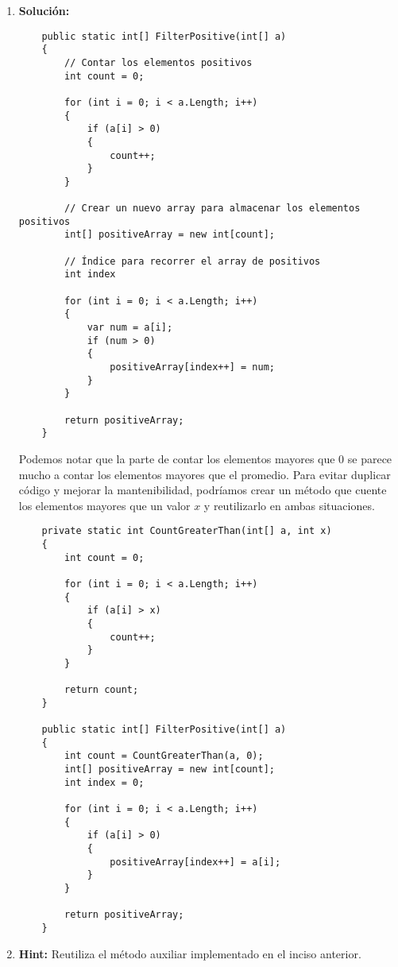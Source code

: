\begin{enumerate}[label=\alph*)]
    \item \textbf{Solución:}
    \begin{lstlisting}
    public static int[] FilterPositive(int[] a)
    {
        // Contar los elementos positivos
        int count = 0;
        
        for (int i = 0; i < a.Length; i++)
        {
            if (a[i] > 0)
            {
                count++;
            }
        }
        
        // Crear un nuevo array para almacenar los elementos positivos
        int[] positiveArray = new int[count];
        
        // Índice para recorrer el array de positivos
        int index 
        
        for (int i = 0; i < a.Length; i++)
        {
            var num = a[i];
            if (num > 0)
            {
                positiveArray[index++] = num;
            }
        }
        
        return positiveArray;
    }
    \end{lstlisting}
    
    Podemos notar que la parte de contar los elementos mayores que 0 se parece mucho a contar los elementos mayores que el promedio. Para evitar duplicar código y mejorar la mantenibilidad, podríamos crear un método que cuente los elementos mayores que un valor \( x \) y reutilizarlo en ambas situaciones.
    
    \begin{lstlisting}
    private static int CountGreaterThan(int[] a, int x)
    {
        int count = 0;
        
        for (int i = 0; i < a.Length; i++)
        {
            if (a[i] > x)
            {
                count++;
            }
        }
        
        return count;
    }
    
    public static int[] FilterPositive(int[] a)
    {
        int count = CountGreaterThan(a, 0);
        int[] positiveArray = new int[count];
        int index = 0;
        
        for (int i = 0; i < a.Length; i++)
        {
            if (a[i] > 0)
            {
                positiveArray[index++] = a[i];
            }
        }
    
        return positiveArray;
    }
    \end{lstlisting}
    \item \textbf{Hint:} Reutiliza el método auxiliar implementado en el inciso anterior.
\end{enumerate}